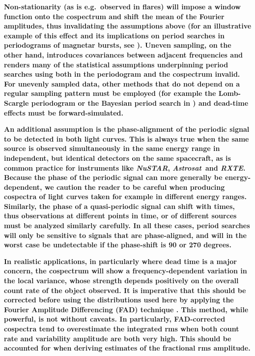 \documentclass[12pt]{emulateapj}
\newcommand{\project}[1]{\textsl{#1}}
\newcommand{\nustar}{\project{NuSTAR}\xspace}
\newcommand{\rxte}{\project{RXTE}\xspace}
\newcommand{\astrosat}{\project{Astrosat}\xspace}
\begin{document}
\textbf{Non-stationarity (as is e.g.\ observed in flares) will impose a window function onto the cospectrum and shift the mean of the Fourier amplitudes, thus invalidating the assumptions above (for an illustrative example of this effect and its implications on period searches in periodograms of magnetar bursts, see \citealt{huppenkothen2013}). Uneven sampling, on the other hand, introduces covariances between adjacent frequencies and renders many of the statistical assumptions underpinning period searches using both in the periodogram and the cospectrum invalid. For unevenly sampled data, other methods that do not depend on a regular sampling pattern must be employed (for example the Lomb-Scargle periodogram \citep{lomb1976, scargle1982} or the Bayesian period search in \citet{gregory1992}) and dead-time effects must be forward-simulated.}

\textbf{An additional assumption is the phase-alignment of the periodic signal to be detected in both light curves. This is always true when the same source is observed simultaneously in the same energy range in independent, but identical detectors on the same spacecraft, as is common practice for instruments like \nustar, \astrosat\ and \rxte. Because the phase of the periodic signal can more generally be energy-dependent, we caution the reader to be careful when producing cospectra of light curves taken for example in different energy ranges. Similarly, the phase of a quasi-periodic signal can shift with times, thus observations at different points in time, or of different sources must be analyzed similarly carefully. In all these cases, period searches will only be sensitive to signals that are phase-aligned, and will in the worst case be undetectable if the phase-shift is 90 or 270 degrees. }

\textbf{In realistic applications, in particularly where dead time is a major concern, the cospectrum will show a frequency-dependent variation in the local variance, whose strength depends positively on the overall count rate of the object observed. It is imperative that this should be corrected before using the distributions used here by applying the Fourier Amplitude Differencing (FAD) technique \citep{bachetti2017}. This method, while powerful, is not without caveats. In particularly, FAD-corrected cospectra tend to overestimate the integrated rms when both count rate and variability amplitude are both very high. This should be accounted for when deriving estimates of the fractional rms amplitude.}
\end{document}

